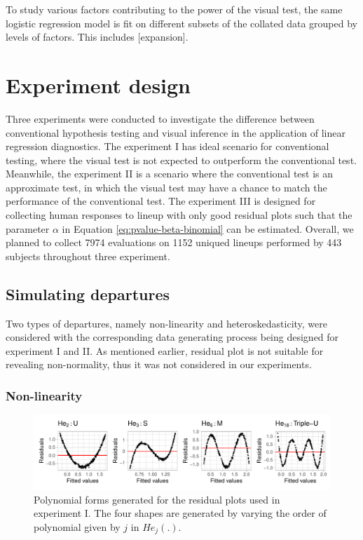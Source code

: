 \documentclass[]{interact}
\theoremstyle{plain}%
\theoremstyle{definition}
\theoremstyle{remark}
\begin{document}
To study various factors contributing to the power of the visual test,
the same logistic regression model is fit on different subsets of the
collated data grouped by levels of factors. This includes
{[}expansion{]}.

\hypertarget{experiment-design}{%
\section{Experiment design}\label{experiment-design}}

Three experiments were conducted to investigate the difference between
conventional hypothesis testing and visual inference in the application
of linear regression diagnostics. The experiment I has ideal scenario
for conventional testing, where the visual test is not expected to
outperform the conventional test. Meanwhile, the experiment II is a
scenario where the conventional test is an approximate test, in which
the visual test may have a chance to match the performance of the
conventional test. The experiment III is designed for collecting human
responses to lineup with only good residual plots such that the
parameter \(\alpha\) in Equation \ref{eq:pvalue-beta-binomial} can be
estimated. Overall, we planned to collect 7974 evaluations on 1152
uniqued lineups performed by 443 subjects throughout three experiment.

\hypertarget{simulating-departures}{%
\subsection{Simulating departures}\label{simulating-departures}}

Two types of departures, namely non-linearity and heteroskedasticity,
were considered with the corresponding data generating process being
designed for experiment I and II. As mentioned earlier, residual plot is
not suitable for revealing non-normality, thus it was not considered in
our experiments.

\hypertarget{non-linearity}{%
\subsubsection{Non-linearity}\label{non-linearity}}

\begin{figure}

{\centering \includegraphics[width=1\linewidth]{paper_comparison_files/figure-latex/different-shape-of-herimite-1} 

}

\caption{Polynomial forms generated for the residual plots used in experiment I. The four shapes are generated by varying the order of polynomial given by $j$ in $He_j(.)$.}\label{fig:different-shape-of-herimite}
\end{figure}
\end{document}
